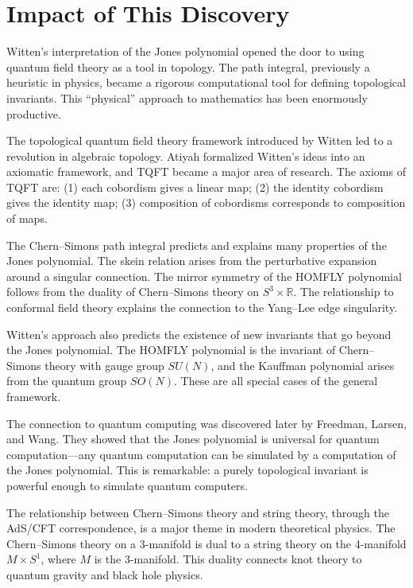 \section{Impact of This Discovery}

Witten's interpretation of the Jones polynomial opened the door to using quantum field theory as a tool in topology. The path integral, previously a heuristic in physics, became a rigorous computational tool for defining topological invariants. This ``physical'' approach to mathematics has been enormously productive.

The topological quantum field theory framework introduced by Witten led to a revolution in algebraic topology. Atiyah formalized Witten's ideas into an axiomatic framework, and TQFT became a major area of research. The axioms of TQFT are: (1) each cobordism gives a linear map; (2) the identity cobordism gives the identity map; (3) composition of cobordisms corresponds to composition of maps.

The Chern--Simons path integral predicts and explains many properties of the Jones polynomial. The skein relation arises from the perturbative expansion around a singular connection. The mirror symmetry of the HOMFLY polynomial follows from the duality of Chern--Simons theory on $S^3 \times \mathbb{R}$. The relationship to conformal field theory explains the connection to the Yang--Lee edge singularity.

Witten's approach also predicts the existence of new invariants that go beyond the Jones polynomial. The HOMFLY polynomial is the invariant of Chern--Simons theory with gauge group $SU(N)$, and the Kauffman polynomial arises from the quantum group $SO(N)$. These are all special cases of the general framework.

The connection to quantum computing was discovered later by Freedman, Larsen, and Wang. They showed that the Jones polynomial is universal for quantum computation---any quantum computation can be simulated by a computation of the Jones polynomial. This is remarkable: a purely topological invariant is powerful enough to simulate quantum computers.

The relationship between Chern--Simons theory and string theory, through the AdS/CFT correspondence, is a major theme in modern theoretical physics. The Chern--Simons theory on a 3-manifold is dual to a string theory on the 4-manifold $M \times S^1$, where $M$ is the 3-manifold. This duality connects knot theory to quantum gravity and black hole physics.

